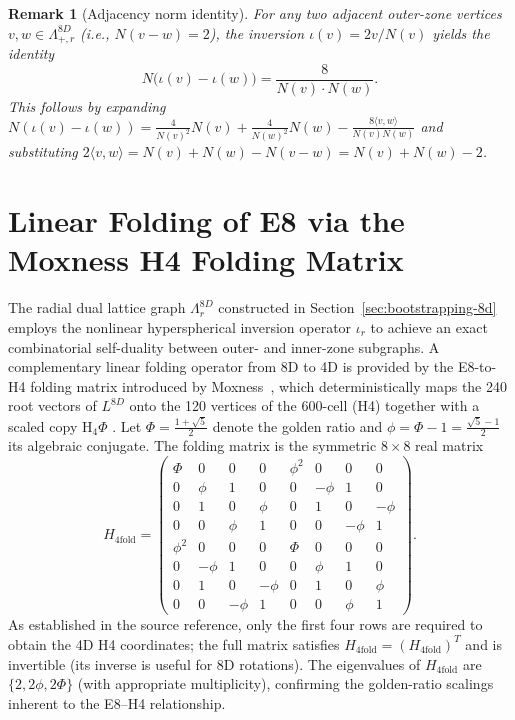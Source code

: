 \documentclass{article}
\newtheorem{remark}{Remark}
\begin{document}
\begin{remark}[Adjacency norm identity]
\label{rem:adjacency-identity}
For any two adjacent outer-zone vertices $v, w \in \Lambda_{+,r}^{8D}$ (i.e., $N(v - w) = 2$), the inversion $\iota(v) = 2v/N(v)$ yields the identity
\[
N\bigl(\iota(v) - \iota(w)\bigr) = \frac{8}{N(v) \cdot N(w)}.
\]
This follows by expanding $N(\iota(v) - \iota(w)) = \frac{4}{N(v)^2} N(v) + \frac{4}{N(w)^2} N(w) - \frac{8 \langle v, w \rangle}{N(v) N(w)}$ and substituting $2\langle v, w \rangle = N(v) + N(w) - N(v-w) = N(v) + N(w) - 2$.
\end{remark}
\section{Linear Folding of E8 via the Moxness H4 Folding Matrix}
\label{sec:h4-folding}
The radial dual lattice graph \(\Lambda_r^{8D}\) constructed in Section~\ref{sec:bootstrapping-8d} employs the nonlinear hyperspherical inversion operator \(\iota_r\) to achieve an exact combinatorial self-duality between outer- and inner-zone subgraphs. A complementary linear folding operator from 8D to 4D is provided by the E8-to-H4 folding matrix introduced by Moxness~\cite{Moxness2014}, which deterministically maps the 240 root vectors of \(L^{8D}\) onto the 120 vertices of the 600-cell (H4) together with a scaled copy \(\mathrm{H}_4\Phi\) \cite{ElserSloane1987,Coxeter1973}.
Let \(\Phi = \frac{1 + \sqrt{5}}{2}\) denote the golden ratio and \(\phi = \Phi - 1 = \frac{\sqrt{5} - 1}{2}\) its algebraic conjugate. The folding matrix is the symmetric \(8 \times 8\) real matrix
\begin{equation}
H_{4\mathrm{fold}} =
\begin{pmatrix}
\Phi & 0 & 0 & 0 & \phi^2 & 0 & 0 & 0 \\
0 & \phi & 1 & 0 & 0 & -\phi & 1 & 0 \\
0 & 1 & 0 & \phi & 0 & 1 & 0 & -\phi \\
0 & 0 & \phi & 1 & 0 & 0 & -\phi & 1 \\
\phi^2 & 0 & 0 & 0 & \Phi & 0 & 0 & 0 \\
0 & -\phi & 1 & 0 & 0 & \phi & 1 & 0 \\
0 & 1 & 0 & -\phi & 0 & 1 & 0 & \phi \\
0 & 0 & -\phi & 1 & 0 & 0 & \phi & 1
\end{pmatrix}.
\label{eq:H4fold}
\end{equation}
As established in the source reference, only the first four rows are required to obtain the 4D H4 coordinates; the full matrix satisfies \(H_{4\mathrm{fold}} = (H_{4\mathrm{fold}})^T\) and is invertible (its inverse is useful for 8D rotations). The eigenvalues of \(H_{4\mathrm{fold}}\) are \(\{2,2\phi,2\Phi\}\) (with appropriate multiplicity), confirming the golden-ratio scalings inherent to the E8–H4 relationship.
\end{document}
